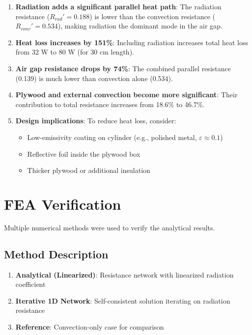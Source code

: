 \documentclass[11pt]{article}
\begin{document}
\begin{enumerate}
    \item \textbf{Radiation adds a significant parallel heat path}: The radiation resistance ($R_{rad}' = 0.188$) is lower than the convection resistance ($R_{conv}' = 0.534$), making radiation the dominant mode in the air gap.

    \item \textbf{Heat loss increases by 151\%}: Including radiation increases total heat loss from 32 W to 80 W (for 30 cm length).

    \item \textbf{Air gap resistance drops by 74\%}: The combined parallel resistance (0.139) is much lower than convection alone (0.534).

    \item \textbf{Plywood and external convection become more significant}: Their contribution to total resistance increases from 18.6\% to 46.7\%.

    \item \textbf{Design implications}: To reduce heat loss, consider:
    \begin{itemize}
        \item Low-emissivity coating on cylinder (e.g., polished metal, $\varepsilon \approx 0.1$)
        \item Reflective foil inside the plywood box
        \item Thicker plywood or additional insulation
    \end{itemize}
\end{enumerate}

\section{FEA Verification}

Multiple numerical methods were used to verify the analytical results.

\subsection{Method Description}

\begin{enumerate}
    \item \textbf{Analytical (Linearized)}: Resistance network with linearized radiation coefficient
    \item \textbf{Iterative 1D Network}: Self-consistent solution iterating on radiation resistance
    \item \textbf{Reference}: Convection-only case for comparison
\end{enumerate}
\end{document}

